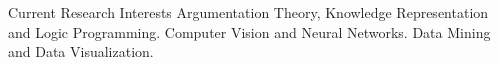 \begin{rubric}{Current Research Interests}
	Argumentation Theory, Knowledge Representation and Logic Programming.
	Computer Vision and Neural Networks.
	Data Mining and Data Visualization.

\end{rubric}
